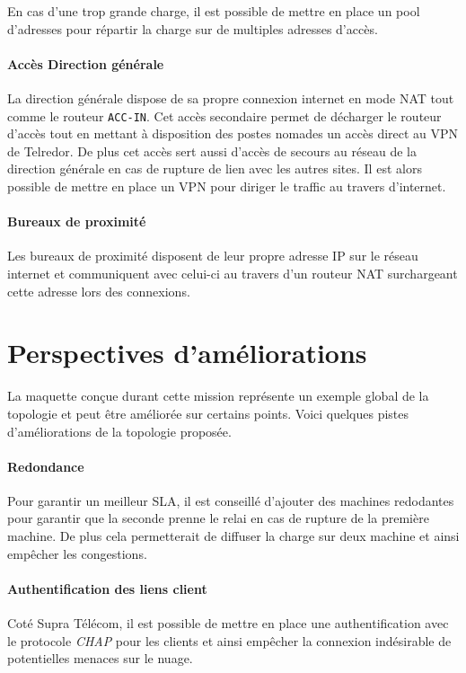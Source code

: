 \documentclass{article}
\newcommand{\tlr}{Telredor\xspace}
\newcommand{\spr}{Supra Télécom\xspace}
\begin{document}
En cas d'une trop grande charge, il est possible de mettre en place un pool d'adresses pour répartir la charge sur de multiples adresses d'accès.

\paragraph{Accès Direction générale}
La direction générale dispose de sa propre connexion internet en mode NAT tout comme le routeur \texttt{ACC-IN}.
Cet accès secondaire permet de décharger le routeur d'accès tout en mettant à disposition des postes nomades un accès direct au VPN de \tlr.
De plus cet accès sert aussi d'accès de secours au réseau de la direction générale en cas de rupture de lien avec les autres sites. Il est alors possible de mettre en place un VPN pour diriger le traffic au travers d'internet.

\paragraph{Bureaux de proximité} Les bureaux de proximité disposent de leur propre adresse IP sur le réseau internet et communiquent avec celui-ci au travers d'un routeur NAT surchargeant cette adresse lors des connexions.

\section{Perspectives d'améliorations}

La maquette conçue durant cette mission représente un exemple global de la topologie et peut être améliorée sur certains points.
Voici quelques pistes d'améliorations de la topologie proposée.

\paragraph{Redondance} Pour garantir un meilleur SLA, il est conseillé d'ajouter des machines redodantes pour garantir que la seconde prenne le relai en cas de rupture de la première machine.
De plus cela permetterait de diffuser la charge sur deux machine et ainsi empêcher les congestions.

\paragraph{Authentification des liens client} Coté \spr, il est possible de mettre en place une authentification avec le protocole \emph{CHAP} pour les clients et ainsi empêcher la connexion indésirable de potentielles menaces sur le nuage.
\end{document}
